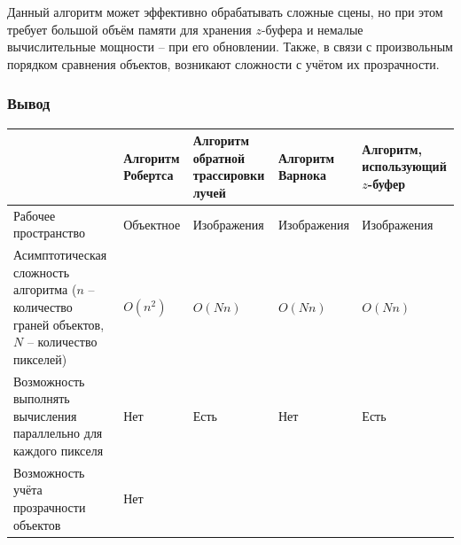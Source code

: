 Данный алгоритм может эффективно обрабатывать сложные сцены, но при этом
требует большой объём памяти для хранения $z$-буфера и немалые вычислительные
мощности -- при его обновлении. Также, в связи с произвольным порядком
сравнения объектов, возникают сложности с учётом их прозрачности.

\subsubsection{Вывод}

\noindent
\begin{adjustbox}{width=1\textwidth}
    \begin{tabular}{|p{}|p{}|p{}|p{}|p{}|}
        \hline
        &
        Алгоритм Робертса
        &
        Алгоритм обратной трассировки лучей
        &
        Алгоритм Варнока
        &
        Алгоритм, использующий $z$-буфер
        \\
        \hline
        Рабочее пространство
        &
        Объектное
        &
        Изображения
        &
        Изображения
        &
        Изображения
        \\
        \hline
        Асимптотическая сложность алгоритма ($n$ -- количество граней объектов,
        $N$ -- количество пикселей)
        &
        \cellcolor{yellow!10}
        $O(n^2)$
        &
        \cellcolor{yellow!10}
        $O(Nn)$
        &
        \cellcolor{yellow!10}
        $O(Nn)$
        &
        \cellcolor{yellow!10}
        $O(Nn)$
        \\
        \hline
        Возможность выполнять вычисления параллельно для каждого пикселя
        &
        \cellcolor{red!10}
        Нет
        &
        \cellcolor{green!10}
        Есть
        &
        \cellcolor{red!10}
        Нет
        &
        \cellcolor{green!10}
        Есть
        \\
        \hline
        Возможность учёта прозрачности объектов
        &
        \cellcolor{red!10}
        Нет
        &

\end{tabular}
\end{adjustbox}
